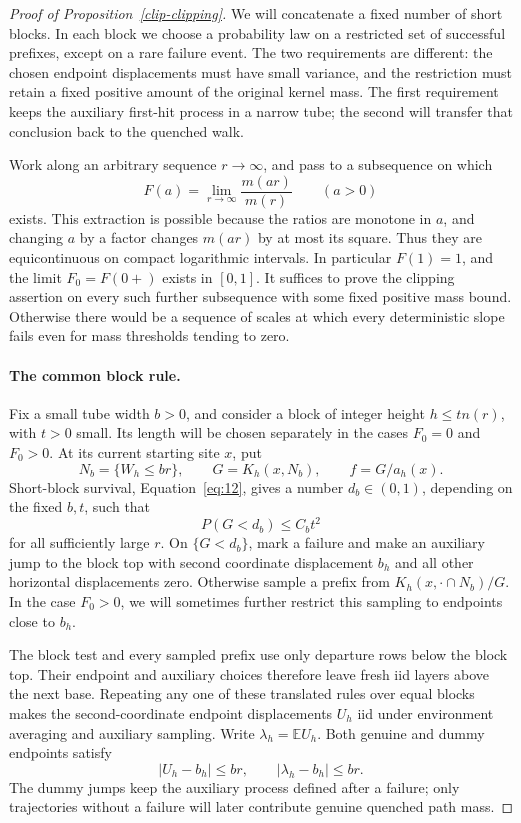 \begin{proof}[Proof of Proposition~\ref{clip-clipping}]
We will concatenate a fixed number of short blocks. In each block we
choose a probability law on a restricted set of successful prefixes,
except on a rare failure event. The two requirements are different:
the chosen endpoint displacements must have small variance, and the
restriction must retain a fixed positive amount of the original kernel
mass. The first requirement keeps the auxiliary first-hit process in a narrow tube;
the second will transfer that conclusion back to the quenched walk.

Work along an arbitrary sequence \(r\to\infty\), and pass to a
subsequence on which
\[
F(a)=\lim_{r\to\infty}\frac{m(ar)}{m(r)}
\qquad(a>0)
\]
exists. This extraction is possible because the ratios are monotone
in \(a\), and changing \(a\) by a factor changes \(m(ar)\) by at most
its square. Thus they are equicontinuous on compact logarithmic
intervals. In particular \(F(1)=1\), and the limit
\(F_0=F(0+)\) exists in \([0,1]\).
It suffices to prove the clipping assertion on every such further
subsequence with some fixed positive mass bound. Otherwise there would
be a sequence of scales at which every deterministic slope fails even
for mass thresholds tending to zero.

\paragraph{The common block rule.}
Fix a small tube width \(b>0\), and consider a block of integer height
\(h\le tn(r)\), with \(t>0\) small. Its length will be chosen
separately in the cases \(F_0=0\) and \(F_0>0\). At its current
starting site \(x\), put
\[
N_b=\{W_h\le br\},\qquad
G=K_h(x,N_b),\qquad f=G/a_h(x).
\]
Short-block survival, Equation~\eqref{eq:12}, gives a number
\(d_b\in(0,1)\), depending on the fixed \(b,t\), such that
\[
P(G<d_b)\le C_b t^2
\]
for all sufficiently large \(r\). On \(\{G<d_b\}\), mark a
failure and make an auxiliary jump to the block top with second
coordinate displacement \(b_h\) and all other horizontal
displacements zero. Otherwise sample a prefix from
\(K_h(x,\cdot\cap N_b)/G\). In the case \(F_0>0\), we will
sometimes further restrict this sampling to endpoints close to \(b_h\).

The block test and every sampled prefix use only departure rows below
the block top. Their endpoint and auxiliary choices therefore leave
fresh iid layers above the next base. Repeating any one of these
translated rules over equal blocks makes the second-coordinate endpoint
displacements \(U_h\) iid under environment averaging and auxiliary
sampling. Write \(\lambda_h=\mathbb E U_h\). Both genuine and dummy
endpoints satisfy
\[
|U_h-b_h|\le br,\qquad |\lambda_h-b_h|\le br.
\]
The dummy jumps keep the auxiliary process defined after a failure;
only trajectories without a failure will later contribute genuine
quenched path mass.


\end{proof}
